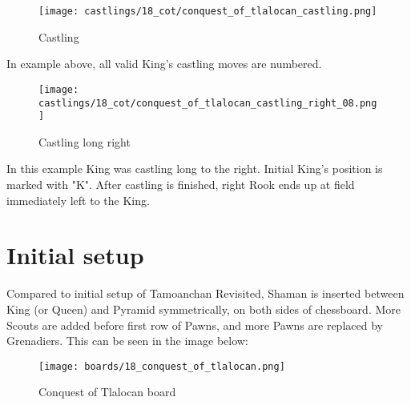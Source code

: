 \noindent
\begin{figure}[!h]
\texttt{[image: castlings/18\_cot/conquest\_of\_tlalocan\_castling.png]}
\caption{Castling}
\label{fig:conquest_of_tlalocan_castling}
\end{figure}

In example above, all valid King's castling moves are numbered.

\noindent
\begin{figure}[!h]
\texttt{[image: castlings/18\_cot/conquest\_of\_tlalocan\_castling\_right\_08.png]}
\caption{Castling long right}
\label{fig:conquest_of_tlalocan_castling_right_08}
\end{figure}

In this example King was castling long to the right. Initial King's position
is marked with "K". After castling is finished, right Rook ends up at field
immediately left to the King.

\clearpage %

\section*{Initial setup}
\label{sec:Conquest of Tlalocan/Initial setup}

Compared to initial setup of Tamoanchan Revisited, Shaman is inserted between
King (or Queen) and Pyramid symmetrically, on both sides of chessboard. More
Scouts are added before first row of Pawns, and more Pawns are replaced by
Grenadiers. This can be seen in the image below:

\noindent
\begin{figure}[h]
\texttt{[image: boards/18\_conquest\_of\_tlalocan.png]}
\caption{Conquest of Tlalocan board}
\label{fig:18_conquest_of_tlalocan}
\end{figure}

\clearpage %

